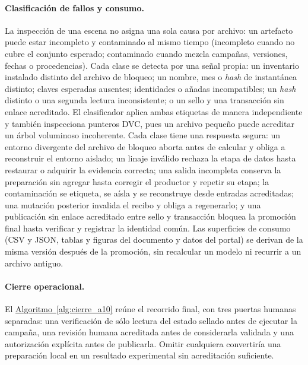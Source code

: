 \documentclass[12pt,letterpaper]{report}
\begin{document}
\paragraph{Clasificación de fallos y consumo.} La inspección de una escena no asigna una sola
causa por archivo: un artefacto puede estar incompleto y contaminado al mismo tiempo (incompleto
cuando no cubre el conjunto esperado; contaminado cuando mezcla campañas, versiones, fechas o
procedencias). Cada clase se detecta por una señal propia: un inventario instalado distinto
del archivo de bloqueo; un nombre, mes o \textit{hash} de instantánea distinto; claves esperadas
ausentes; identidades o añadas incompatibles; un \textit{hash} distinto o una segunda lectura
inconsistente; o un sello y una transacción sin enlace acreditado. El clasificador aplica ambas
etiquetas de manera independiente y también inspecciona
punteros DVC, pues un archivo pequeño puede acreditar un árbol voluminoso incoherente. Cada clase
tiene una respuesta segura: un entorno divergente del archivo de bloqueo aborta antes de calcular y
obliga a reconstruir el entorno aislado; un linaje inválido rechaza la etapa de datos hasta
restaurar o adquirir la evidencia correcta; una salida incompleta conserva la preparación sin
agregar hasta corregir el productor y repetir su etapa; la contaminación se etiqueta, se aísla y se
reconstruye desde entradas acreditadas; una mutación posterior invalida el recibo y obliga a
regenerarlo; y una publicación sin enlace acreditado entre sello y transacción bloquea la promoción
final hasta verificar y registrar la identidad común. Las superficies de consumo (CSV y JSON, tablas y figuras del documento y datos del
portal) se derivan de la misma versión después de la promoción, sin recalcular un modelo ni
recurrir a un archivo antiguo.

\paragraph{Cierre operacional.} El \hyperref[alg:cierre_a10]{Algoritmo~\ref*{alg:cierre_a10}} reúne el recorrido final, con
tres puertas humanas separadas: una verificación de sólo lectura del estado sellado antes de ejecutar
la campaña, una revisión humana acreditada antes de considerarla validada y una autorización
explícita antes de publicarla. Omitir cualquiera convertiría una preparación local en un resultado
experimental sin acreditación suficiente.
\end{document}
